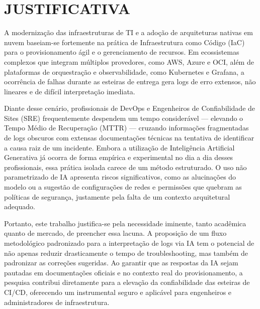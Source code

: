\section{JUSTIFICATIVA}

A modernização das infraestruturas de TI e a adoção de arquiteturas nativas em nuvem baseiam-se fortemente na prática de Infraestrutura como Código (IaC) para o provisionamento ágil e o gerenciamento de recursos. Em ecossistemas complexos que integram múltiplos provedores, como AWS, Azure e OCI, além de plataformas de orquestração e observabilidade, como Kubernetes e Grafana, a ocorrência de falhas durante as esteiras de entrega gera logs de erro extensos, não lineares e de difícil interpretação imediata.

Diante desse cenário, profissionais de DevOps e Engenheiros de Confiabilidade de Sites (SRE) frequentemente despendem um tempo considerável --- elevando o Tempo Médio de Recuperação (MTTR) --- cruzando informações fragmentadas de logs obscuros com extensas documentações técnicas na tentativa de identificar a causa raiz de um incidente. Embora a utilização de Inteligência Artificial Generativa já ocorra de forma empírica e experimental no dia a dia desses profissionais, essa prática isolada carece de um método estruturado. O uso não parametrizado de IA apresenta riscos significativos, como as alucinações do modelo ou a sugestão de configurações de redes e permissões que quebram as políticas de segurança, justamente pela falta de um contexto arquitetural adequado.

Portanto, este trabalho justifica-se pela necessidade iminente, tanto acadêmica quanto de mercado, de preencher essa lacuna. A proposição de um fluxo metodológico padronizado para a interpretação de logs via IA tem o potencial de não apenas reduzir drasticamente o tempo de troubleshooting, mas também de padronizar as correções sugeridas. Ao garantir que as respostas da IA sejam pautadas em documentações oficiais e no contexto real do provisionamento, a pesquisa contribui diretamente para a elevação da confiabilidade das esteiras de CI/CD, oferecendo um instrumental seguro e aplicável para engenheiros e administradores de infraestrutura.
